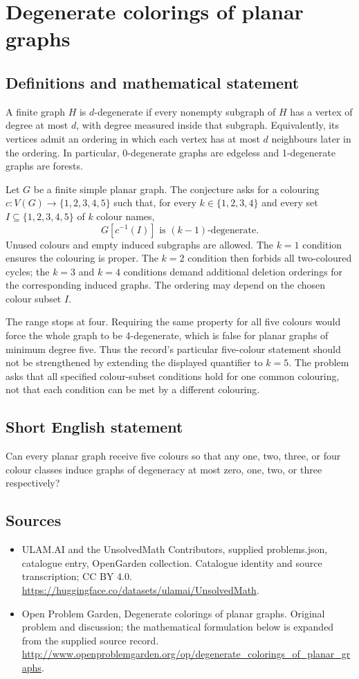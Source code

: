 \documentclass[11pt,a4paper]{article}
\begin{document}
\section*{Degenerate colorings of planar graphs}\label{statement}

\subsection{Definitions and mathematical statement}
A finite graph $H$ is $d$-degenerate if every nonempty subgraph of $H$
has a vertex of degree at most $d$, with degree measured inside that
subgraph. Equivalently, its vertices admit an ordering in which each
vertex has at most $d$ neighbours later in the ordering. In particular,
0-degenerate graphs are edgeless and 1-degenerate graphs are forests.

Let $G$ be a finite simple planar graph. The conjecture asks for a
colouring $c:V(G)\to\{1,2,3,4,5\}$ such that, for every
$k\in\{1,2,3,4\}$ and every set $I\subseteq\{1,2,3,4,5\}$ of
$k$ colour names,
\[
                         G[c^{-1}(I)]
                       \text{ is }(k-1)\text{-degenerate}.
\]
Unused colours and empty induced subgraphs are allowed. The $k=1$
condition ensures the colouring is proper. The $k=2$ condition then
forbids all two-coloured cycles; the $k=3$ and $k=4$ conditions demand
additional deletion orderings for the corresponding induced graphs.
The ordering may depend on the chosen colour subset $I$.

The range stops at four. Requiring the same property for all five
colours would force the whole graph to be 4-degenerate, which is
false for planar graphs of minimum degree five. Thus the record's
particular five-colour statement should not be strengthened by
extending the displayed quantifier to $k=5$. The problem asks that
all specified colour-subset conditions hold for one common colouring,
not that each condition can be met by a different colouring.
\subsection{Short English statement}
Can every planar graph receive five colours so that any one, two, three, or four colour classes induce graphs of degeneracy at most zero, one, two, or three respectively?
\subsection{Sources}
\begin{itemize}
\item[S1] ULAM.AI and the UnsolvedMath Contributors, supplied problems.json, catalogue entry, OpenGarden collection. Catalogue identity and source transcription; CC BY 4.0.
\url{https://huggingface.co/datasets/ulamai/UnsolvedMath}.
\item[S2] Open Problem Garden, Degenerate colorings of planar graphs. Original problem and discussion; the mathematical formulation below is expanded from the supplied source record.
\url{http://www.openproblemgarden.org/op/degenerate_colorings_of_planar_graphs}.
\end{itemize}
\end{document}
